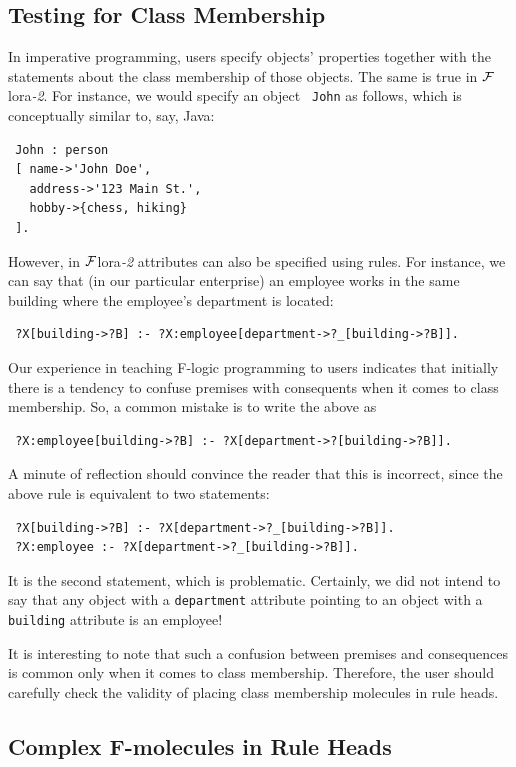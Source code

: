 \documentclass[11pt]{article}
\newcommand{\FLORA}{{\mbox{\sc ${\cal F}${lora}\rm\emph{-2}}}\xspace}
\begin{document}
\subsection{Testing for Class Membership}

In imperative programming, users specify objects' properties together with
the statements about the class membership of those objects.
The same is true in \FLORA. For instance, we would specify an object {\tt
  John} as follows, which is conceptually similar to, say, Java:
\begin{verbatim}
 John : person
 [ name->'John Doe',
   address->'123 Main St.',
   hobby->{chess, hiking}
 ].
\end{verbatim}
However, in \FLORA attributes can also be specified using rules. For
instance, we can say that (in our particular enterprise)
an employee works in the same building where the employee's department is
located:
\begin{verbatim}
 ?X[building->?B] :- ?X:employee[department->?_[building->?B]].  
\end{verbatim}
Our experience in teaching F-logic programming to users indicates that
initially there is a tendency to confuse premises with consequents when it
comes to class membership. So, a common mistake is to write the above as
\begin{verbatim}
 ?X:employee[building->?B] :- ?X[department->?[building->?B]].  
\end{verbatim}
A minute of reflection should convince the reader that this is incorrect, since
the above rule is equivalent to two statements:
\begin{verbatim}
 ?X[building->?B] :- ?X[department->?_[building->?B]].  
 ?X:employee :- ?X[department->?_[building->?B]].
\end{verbatim}
It is the second statement, which is problematic. Certainly, we did not
intend to say that any object with a {\tt department} attribute pointing to
an object with a {\tt building} attribute is an employee!

It is interesting to note that such a confusion between premises and
consequences is common only when it comes to class membership. Therefore,
the user should carefully check the validity of placing class membership
molecules in rule heads.

\subsection{Complex F-molecules in Rule Heads}
\end{document}
